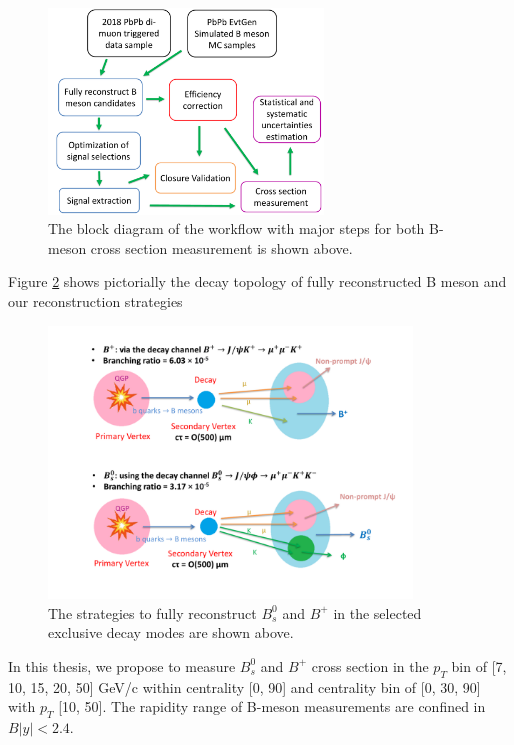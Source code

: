 \begin{figure}[hbtp]
\begin{center}
\includegraphics[width=0.65\textwidth]{Figures/Chapter4/BsBPWorkFlow.pdf}
\caption{The block diagram of the workflow with major steps for both B-meson cross section measurement is shown above.}
\label{BsBPWorkFlow}
\end{center}
\end{figure} 

Figure \ref{BsBPRECO} shows pictorially the decay topology of fully reconstructed B meson and our reconstruction strategies

\begin{figure}[hbtp]
\begin{center}
\includegraphics[width=0.86\textwidth]{Figures/Chapter4/BsBPRECO.pdf}
\caption{The strategies to fully reconstruct $B^0_s$ and $B^+$ in the selected exclusive decay modes are shown above.}
\label{BsBPRECO}
\end{center}
\end{figure} 

In this thesis, we propose to measure $B^0_s$ and $B^+$ cross section in the $p_T$ bin of [7, 10, 15, 20, 50] GeV/c within centrality [0, 90] and centrality bin of [0, 30, 90] with $p_T$ [10, 50]. The rapidity range of B-meson measurements are confined in $B |y| < 2.4$.

